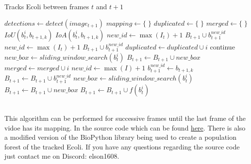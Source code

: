 \documentclass{article}
\begin{document}
\begin{algorithm}
    \caption{Tracks Ecoli between frames $t$ and $t+1$}
    \label{alg:tracking}
    \renewcommand{\thealgorithm}{}
    \begin{algorithmic}[1]
        \State $\mathit{detections} \gets \mathit{detect(image_{t+1})}$
        \State $\mathit{mapping} \gets \mathit{\{\;\}}$
        \State $\mathit{duplicated} \gets \mathit{\mathit{\{\;\}}}$
        \State $\mathit{merged} \gets \mathit{\mathit{\{\;\}}}$
                \State $IoU(b_{t}^i, b_{t+1, k})$
                \State $IoA(b_{t}^i, b_{t+1, k})$
            \EndFor
                \State $\mathit{new\_id} \gets \max (I_t) + 1$
                \State $B_{t+1} \cup b_{t+1}^{new\_id}$    
                \State $\mathit{new\_id} \gets \max (I_t) + 1$
                \State $B_{t+1} \cup b_{t+1}^{new\_id}$
                \State $\mathit{duplicated} \gets \mathit{duplicated} \cup i$    
            \EndIf
        \EndFor
            continue 
        \EndIf
         
            \State $new\_box \gets \mathit{sliding\_window\_search\left(b_{t}^i\right)}$
            \State $B_{t+1} \gets B_{t+1} \cup \mathit{new\_box}$
            \State $\mathit{merged} \gets \mathit{merged} \cup i$ 
        \EndFor
         
                \State $\mathit{new\_id} \gets \max (I) + 1$
                \State $b_{t+1}^{new\_id} \gets b_{t+1, k}$
                \State $B_{t+1} \gets B_{t+1} \cup \mathit{b_{t+1}^{new\_id}}$ 
            \EndIf
        \EndFor
         
                \State $new\_box \gets \mathit{sliding\_window\_search\left(b_{t}^i\right)}$
                \State $B_{t+1} \gets B_{t+1} \cup \mathit{new\_box}$ 
            \EndIf
        \EndFor
            \State $B_{t+1} \gets B_{t+1} \cup f(b_{t}^i)$ 
        \EndFor
\end{algorithmic}\end{algorithm}\\
This algorithm can be performed for successive frames until the last frame of the vidoe has its mapping.
In the source code which can be found \href{https://github.com/BioDisCo/ecolitracking}{here}. There is also a
modified version of the BioPython library being used to create a population forest of the tracked Ecoli. If you have
any questions regarding the source code just contact me on Discord: elson1608. 
\end{document}
